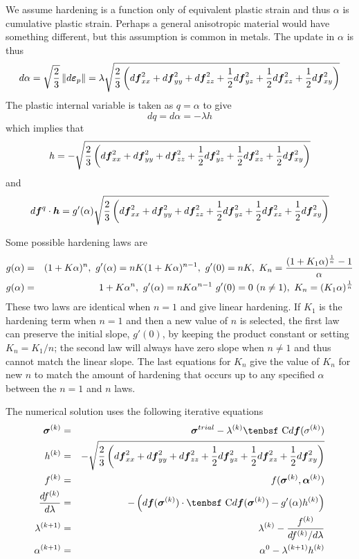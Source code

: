 \documentclass[11pt]{book}
\renewcommand{\vec}[1]{\boldsymbol{#1}}
\def\C{\hbox{\tenbsf C}}
\def\dpl{d \vec{\varepsilon}_{p}}
\def\df{d \vec{f}}
\def\dfq{d \vec{f}^q}
\begin{document}
We assume hardening is a function only of equivalent plastic strain and thus $\alpha$ is cumulative plastic strain. Perhaps a general anisotropic material would have something different, but this assumption is common in metals. The update in $\alpha$ is thus
\begin{equation}
     d\alpha = \sqrt{2\over 3}\thinspace \| \dpl\| = \lambda \sqrt{{2\over 3}\left(\df_{xx}^2 + \df_{yy}^2 + \df_{zz}^2 + {1\over2}\df_{yz}^2+ {1\over2}\df_{xz}^2+ {1\over2}\df_{xy}^2\right)}
\end{equation}
The plastic internal variable is taken as $q=\alpha$ to give
\begin{equation}
    dq = d\alpha = -\lambda h
\end{equation}
which implies that
\begin{equation}
       h = - \sqrt{{2\over 3}\left(\df_{xx}^2 + \df_{yy}^2 + \df_{zz}^2 + {1\over2}\df_{yz}^2+ {1\over2}\df_{xz}^2+ {1\over2}\df_{xy}^2\right)}
\end{equation}
and 
\begin{equation}
       \dfq \cdot \vec h  = g'(\alpha) \sqrt{{2\over 3}\left(\df_{xx}^2 + \df_{yy}^2 + \df_{zz}^2 +{1\over2}\df_{yz}^2+ {1\over2}\df_{xz}^2+ {1\over2}\df_{xy}^2\right)}
\end{equation}

Some possible hardening laws are
\begin{eqnarray}
     g(\alpha)  & = & (1 + K\alpha)^n, \  g'(\alpha) =  nK(1+K\alpha)^{n-1}, \  g'(0)=nK, \  K_n={(1+K_1\alpha)^{1\over n} - 1\over \alpha}  \\
     g(\alpha)  & = & 1 + K\alpha^n, \  g'(\alpha) =  nK\alpha^{n-1} \  g'(0)=0\ (n\ne1), \ K_n = (K_1\alpha)^{1\over n}
\end{eqnarray}
These two laws are identical when $n=1$ and give linear hardening. If $K_1$ is the hardening term when $n=1$ and then a new value of $n$ is selected, the first law can preserve the initial slope, $g'(0)$, by keeping the product constant or setting $K_n = K_1/n$; the second law will always have zero slope when $n\ne1$ and thus cannot match the linear slope. The last equations for $K_n$ give the value of $K_n$ for new $n$ to match the amount of hardening that occurs up to any specified $\alpha$ between the $n=1$ and $n$ laws.

The numerical solution uses the following iterative equations
\begin{eqnarray}
       \vec\sigma^{(k)} & = & \vec\sigma^{trial} - \lambda^{(k)}\C\df(\sigma^{(k)}) \\
        h^{(k)} & = & - \sqrt{{2\over 3}\left(\df_{xx}^2 + \df_{yy}^2 + \df_{zz}^2 + {1\over2}\df_{yz}^2+ {1\over2}\df_{xz}^2+ {1\over2}\df_{xy}^2\right)} \\
        f^{(k)} & = &  f( \vec\sigma^{(k)},\vec\alpha^{(k)})  \\
        {df^{(k)}\over d\lambda} & = & -\left( \df(\vec\sigma^{(k)})\cdot \C\df(\vec\sigma^{(k)}) -g'(\alpha)h^{(k)}\right) \\
        \lambda^{(k+1)} & = & \lambda^{(k)} - {f^{(k)} \over {df^{(k)}/ d\lambda} } \\
        \alpha^{(k+1)} & = & \alpha^{0} -  \lambda^{(k+1)} h^{(k)}
\end{eqnarray}
\end{document}
